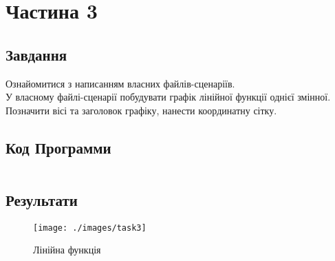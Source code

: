 \section{Частина 3}
\label{sec:task3}

\subsection{Завдання}
\label{subsec:task3_task}

Ознайомитися з написанням власних файлів-сценаріїв. \\
У власному файлі-сценарії побудувати графік лінійної функції однієї змінної. \\
Позначити вісі та заголовок графіку, нанести координатну сітку.

\subsection{Код Программи}
\label{subsec:task3_code}
\inputminted{python}{../src/task3.py}

\subsection{Результати}
\label{subsec:task3_results}

\begin{figure}[!ht]
    \centering
    \texttt{[image: ./images/task3]}
    \caption{Лінійна функція}
    \label{fig:linear_function}
\end{figure}
